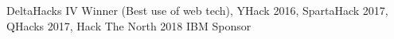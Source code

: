 


\begin{cvparagraph}


DeltaHacks IV Winner (Best use of web tech), YHack 2016, SpartaHack 2017, QHacks 2017, Hack The North 2018 IBM Sponsor


\end{cvparagraph}